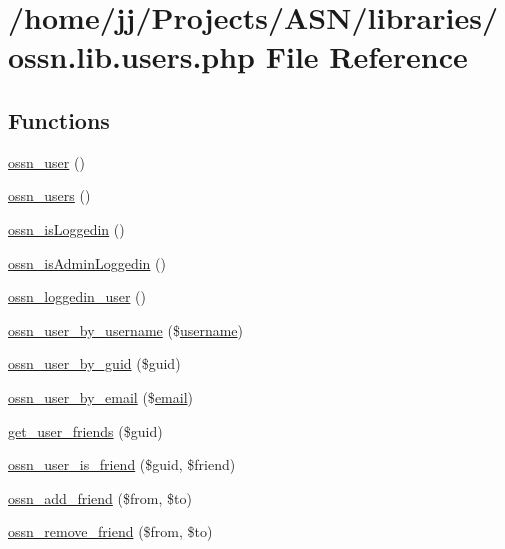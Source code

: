 \hypertarget{ossn_8lib_8users_8php}{}\section{/home/jj/\+Projects/\+A\+S\+N/libraries/ossn.lib.\+users.\+php File Reference}
\label{ossn_8lib_8users_8php}
\subsection*{Functions}
\begin{DoxyCompactItemize}
\item 
\hyperlink{ossn_8lib_8users_8php_a25dfa9c915af6606ac88fbf343e1b314}{ossn\+\_\+user} ()
\item 
\hyperlink{ossn_8lib_8users_8php_a4c158699e1dfdfb749ee3595f0d42866}{ossn\+\_\+users} ()
\item 
\hyperlink{ossn_8lib_8users_8php_a709b82b89b564332723652ed2a36e6b8}{ossn\+\_\+is\+Loggedin} ()
\item 
\hyperlink{ossn_8lib_8users_8php_abf45a4c659ffd196160e8173c2af1106}{ossn\+\_\+is\+Admin\+Loggedin} ()
\item 
\hyperlink{ossn_8lib_8users_8php_aa3c8068d0e6638b414d6a2f6c62565b8}{ossn\+\_\+loggedin\+\_\+user} ()
\item 
\hyperlink{ossn_8lib_8users_8php_a77fdcb678aedd165af1f9f875645c864}{ossn\+\_\+user\+\_\+by\+\_\+username} (\$\hyperlink{actions_2account_8php_ac9b3768ccc688c2ff0811c50c107a02e}{username})
\item 
\hyperlink{ossn_8lib_8users_8php_aaee344fada9e6e15470587c7cd94ea8b}{ossn\+\_\+user\+\_\+by\+\_\+guid} (\$guid)
\item 
\hyperlink{ossn_8lib_8users_8php_a94038a27190428af074339ac9b243445}{ossn\+\_\+user\+\_\+by\+\_\+email} (\$\hyperlink{actions_2account_8php_a011c66ae212438e0d7de7c0e40451bb3}{email})
\item 
\hyperlink{ossn_8lib_8users_8php_acd39f7bce1cc8e231afba8b0117eb566}{get\+\_\+user\+\_\+friends} (\$guid)
\item 
\hyperlink{ossn_8lib_8users_8php_a3ac6849a8163e7fade08e00fd5cc6bb6}{ossn\+\_\+user\+\_\+is\+\_\+friend} (\$guid, \$friend)
\item 
\hyperlink{ossn_8lib_8users_8php_af9b85b9982793eb5ce64b769bcdb7a34}{ossn\+\_\+add\+\_\+friend} (\$from, \$to)
\item 
\hyperlink{ossn_8lib_8users_8php_aeb55695fd2555ee812942c2fbd1ee600}{ossn\+\_\+remove\+\_\+friend} (\$from, \$to)

\end{DoxyCompactItemize}
